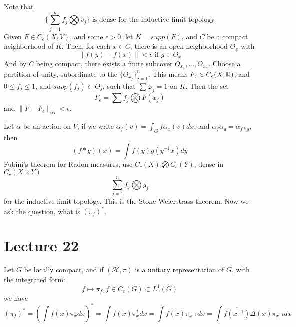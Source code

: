Note that
\begin{equation*}
    \{\sum_{j=1}^nf_j\bigotimes v_j\} \text{ is dense for the inductive limit topology}
\end{equation*}
Given $F\in C_c(X,V)$, and some $\epsilon>0$, let $K=supp(F)$, and $C$ be a compact neighborhood of $K$. Then, for each $x\in C$, there is an open neighborhood $O_x$ with
\begin{equation*}
    \|f(y)-f(x)\|<\epsilon \text{ if } g\in O_x
\end{equation*}
And by $C$ being compact, there exists a finite subcover $O_{x_1}, ..., O_{x_n}$. Choose a partition of unity, subordinate to the $\{O_{x_j}\}_{j=1}^n$. This means $F_j\in C_c(X,\mathbb{R})$, and $0\leq f_j\leq 1$, and $supp(f_j)\subset O_j$, such that $\sum\varphi_j=1$ on $K$. Then the set
\begin{equation*}
    F_\epsilon=\sum f_j\bigotimes F(x_j)
\end{equation*}
and $\|F-F_\epsilon\|_\infty<\epsilon$. 

Let $\alpha$ be an action on $V$, if we write $\alpha_f(v)=\int_G f\alpha_x(v)dx$, and $\alpha_f\alpha_g=\alpha_{f\ast g}$, then
\begin{equation*}
    (f\ast g)(x)=\int f(y)g(y^{-1}x)dy
\end{equation*}
Fubini's theorem for Radon measures,  use $C_c(X)\bigotimes C_c(Y)$, dense in $C_c(X\times Y)$
\begin{equation*}
    \sum_{j=1}^n f_j\bigotimes g_j
\end{equation*}
for the inductive limit topology. This is the Stone-Weierstrass theorem. Now we ask the question, what is $(\pi_f)^*$.

\section{Lecture 22}
Let $G$ be locally compact, and if $(\mathcal{H}, \pi)$ is a unitary representation of $G$, with the integrated form:
\begin{equation*}
    f\mapsto\pi_f, f\in C_c(G)\subset L^1(G)
\end{equation*}
we have
\begin{equation*}
    (\pi_f)^*=\left( \int f(x)\pi_xdx\right)^*=\int\overline{f(x)}\pi_x^*dx=\int\overline{f(x)}\pi_{x^{-1}}dx=\int\overline{f(x^{-1})}\Delta(x)\pi_{x^{-1}}dx
\end{equation*}

